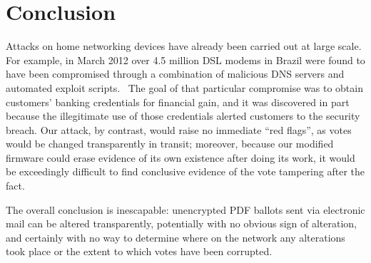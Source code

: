 \documentclass{article}
\begin{document}
\section{Conclusion}

Attacks on home networking devices have already been carried out at
large scale. For example, in March 2012 over 4.5 million DSL modems in
Brazil were found to have been compromised through a combination of
malicious DNS servers and automated exploit
scripts.~\cite{BrazilExploit} The goal of that particular compromise
was to obtain customers' banking credentials for financial gain, and
it was discovered in part because the illegitimate use of those
credentials alerted customers to the security breach. Our attack, by
contrast, would raise no immediate ``red flags'', as votes would be
changed transparently in transit; moreover, because our modified
firmware could erase evidence of its own existence after doing its
work, it would be exceedingly difficult to find conclusive evidence of
the vote tampering after the fact.

The overall conclusion is inescapable: unencrypted PDF ballots sent
via electronic mail can be altered transparently, potentially with no
obvious sign of alteration, and certainly with no way to determine
where on the network any alterations took place or the extent to which
votes have been corrupted.










% 
\end{document}
